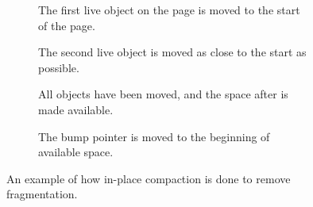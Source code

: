 \begin{figure}[H]
    \centering
    \begin{subfigure}[t]{.2\textwidth}
        \centering
        
        \caption{The first live object on the page is moved to the start of the page.}
        \label{fig:zrel_in1}
    \end{subfigure}
    \hfill\vline\hfill
    \begin{subfigure}[t]{.2\textwidth}
        \centering
        
        \caption{The second live object is moved as close to the start as possible.}
        \label{fig:zrel_in1}
    \end{subfigure}
    \hfill\vline\hfill
    \begin{subfigure}[t]{.2\textwidth}
        \centering
        
        \caption{All objects have been moved, and the space after is made available.}
        \label{fig:zrel_in1}
    \end{subfigure}
    \hfill\vline\hfill
    \begin{subfigure}[t]{.2\textwidth}
        \centering
        
        \caption{The bump pointer is moved to the beginning of available space.}
        \label{fig:zrel_in1}
    \end{subfigure}
    \caption{An example of how in-place compaction is done to remove fragmentation.}
    \label{fig:zrel_in}
\end{figure}

